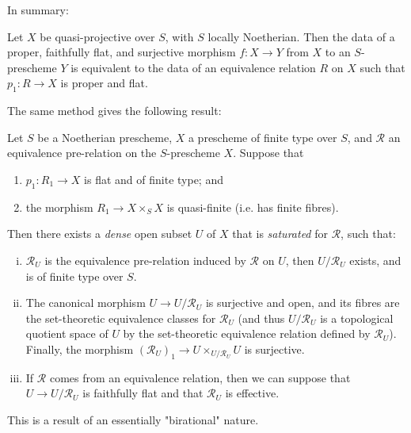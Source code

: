 In summary:

\begin{aside}\label{fga3.iii-6-scholium}
    Let $X$ be quasi-projective over $S$, with $S$ locally Noetherian.
    Then the data of a proper, faithfully flat, and surjective morphism $f\colon X\to Y$ from $X$ to an $S$-prescheme $Y$ is equivalent to the data of an equivalence relation $R$ on $X$ such that $p_1\colon R\to X$ is proper and flat.
\end{aside}


The same method gives the following result:


\begin{theorem}\label{fga3.iii-6-theorem-6.2}
    Let $S$ be a Noetherian prescheme, $X$ a prescheme of finite type over $S$, and $\mathcal{R}$ an equivalence pre-relation on the $S$-prescheme $X$.
    Suppose that
    \begin{enumerate}[label=\alph*.]
        \item $p_1\colon R_1\to X$ is flat and of finite type; and
        \item the morphism $R_1\to X\times_S X$ is quasi-finite (i.e. has finite fibres).
    \end{enumerate}

    Then there exists a \emph{dense} open subset $U$ of $X$ that is \emph{saturated} for $\mathcal{R}$, such that:

    \begin{enumerate}[i.]
        \item $\mathcal{R}_U$ is the equivalence pre-relation induced by $\mathcal{R}$ on $U$, then $U/\mathcal{R}_U$ exists, and is of finite type over $S$.
        \item The canonical morphism $U\to U/\mathcal{R}_U$ is surjective and open, and its fibres are the set-theoretic equivalence classes for $\mathcal{R}_U$ (and thus $U/\mathcal{R}_U$ is a topological quotient space of $U$ by the set-theoretic equivalence relation defined by $\mathcal{R}_U$).
              Finally, the morphism $(\mathcal{R}_U)_1\to U\times_{U/\mathcal{R}_U}U$ is surjective.
        \item If $\mathcal{R}$ comes from an equivalence relation, then we can suppose that $U\to U/\mathcal{R}_U$ is faithfully flat and that $\mathcal{R}_U$ is effective.
    \end{enumerate}
\end{theorem}



This is a result of an essentially "birational" nature.



